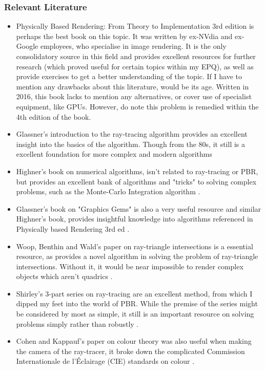 \documentclass[../main.tex]{subfiles}
\begin{document}
\subsubsection{Relevant Literature}
\begin{itemize}
  \item Physically Based Rendering: From Theory to Implementation 3rd edition \cite{pharrPhysicallyBasedRendering2016} is perhaps the best book on this topic. It was written by ex-NVdia and ex-Google employees, who specialise in image rendering. It is the only consolidatory source in this field and provides excellent resources for further research (which proved useful for certain topics within my EPQ), as well as provide exercises to get a better understanding of the topic. If I have to mention any drawbacks about this literature, would be its age. Written in 2016, this book lacks to mention any alternatives, or cover use of specialist equipment, like GPUs. However, do note this problem is remedied within the 4th edition of the book.
  \item Glassner's introduction to the ray-tracing algorithm provides an excellent insight into the basics of the algorithm. Though from the 80s, it still is a excellent foundation for more complex and modern algorithms \cite{glassnerIntroductionRayTracing1989}  
  \item Highner's book on numerical algorithms, isn't related to ray-tracing or PBR, but provides an excellent bank of algorithms and "tricks" to solving complex problems, such as the Monte-Carlo Integration algorithm \cite{highamAccuracyStabilityNumerical2002a}.
  \item Glassner's book on "Graphics Gems" is also a very useful resource and similar Highner's book, provides insightful knowledge into algorithms referenced in Physically based Rendering 3rd ed \cite{approfessionalfirmAPProfessionalGraphics1995}.
  \item Woop, Benthin and Wald's paper on ray-triangle intersections is a essential resource, as provides a novel algorithm in solving the problem of ray-triangle intersections. Without it, it would be near impossible to render complex objects which aren't quadrics \cite{woopWatertightRayTriangle2013}.
  \item Shirley's 3-part series on ray-tracing are an excellent method, from which I dipped my feet into the world of PBR. While the premise of the series might be considered by most as simple, it still is an important resource on solving problems simply rather than robustly \cite{petershirleytrevordavidblackstevehollaschRayTracingOne}.
  \item Cohen and Kappauf's paper on colour theory was also useful when making the camera of the ray-tracer, it broke down the complicated Commission Internationale de l’Éclairage (CIE) standards on colour \cite{cohenColorMixtureFundamental1985}.
\end{itemize}
\end{document}
